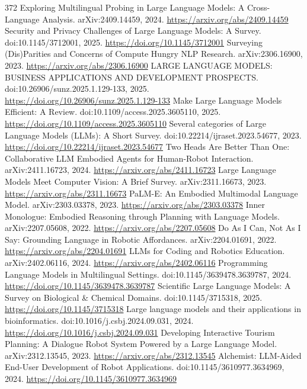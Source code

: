 \documentclass[11pt]{article}
\begin{document}
\begin{thebibliography}{372}
 Exploring Multilingual Probing in Large Language Models: A Cross-Language Analysis. arXiv:2409.14459, 2024. \url{https://arxiv.org/abs/2409.14459}
 Security and Privacy Challenges of Large Language Models: A Survey. doi:10.1145/3712001, 2025. \url{https://doi.org/10.1145/3712001}
 Surveying (Dis)Parities and Concerns of Compute Hungry NLP Research. arXiv:2306.16900, 2023. \url{https://arxiv.org/abs/2306.16900}
 LARGE LANGUAGE MODELS: BUSINESS APPLICATIONS AND DEVELOPMENT PROSPECTS. doi:10.26906/sunz.2025.1.129-133, 2025. \url{https://doi.org/10.26906/sunz.2025.1.129-133}
 Make Large Language Models Efficient: A Review. doi:10.1109/access.2025.3605110, 2025. \url{https://doi.org/10.1109/access.2025.3605110}
 Several categories of Large Language Models (LLMs): A Short Survey. doi:10.22214/ijraset.2023.54677, 2023. \url{https://doi.org/10.22214/ijraset.2023.54677}
 Two Heads Are Better Than One: Collaborative LLM Embodied Agents for Human-Robot Interaction. arXiv:2411.16723, 2024. \url{https://arxiv.org/abs/2411.16723}
 Large Language Models Meet Computer Vision: A Brief Survey. arXiv:2311.16673, 2023. \url{https://arxiv.org/abs/2311.16673}
 PaLM-E: An Embodied Multimodal Language Model. arXiv:2303.03378, 2023. \url{https://arxiv.org/abs/2303.03378}
 Inner Monologue: Embodied Reasoning through Planning with Language Models. arXiv:2207.05608, 2022. \url{https://arxiv.org/abs/2207.05608}
 Do As I Can, Not As I Say: Grounding Language in Robotic Affordances. arXiv:2204.01691, 2022. \url{https://arxiv.org/abs/2204.01691}
 LLMs for Coding and Robotics Education. arXiv:2402.06116, 2024. \url{https://arxiv.org/abs/2402.06116}
 Programming Language Models in Multilingual Settings. doi:10.1145/3639478.3639787, 2024. \url{https://doi.org/10.1145/3639478.3639787}
 Scientific Large Language Models: A Survey on Biological \& Chemical Domains. doi:10.1145/3715318, 2025. \url{https://doi.org/10.1145/3715318}
 Large language models and their applications in bioinformatics. doi:10.1016/j.csbj.2024.09.031, 2024. \url{https://doi.org/10.1016/j.csbj.2024.09.031}
 Developing Interactive Tourism Planning: A Dialogue Robot System Powered by a Large Language Model. arXiv:2312.13545, 2023. \url{https://arxiv.org/abs/2312.13545}
 Alchemist: LLM-Aided End-User Development of Robot Applications. doi:10.1145/3610977.3634969, 2024. \url{https://doi.org/10.1145/3610977.3634969}

\end{thebibliography}
\end{document}
